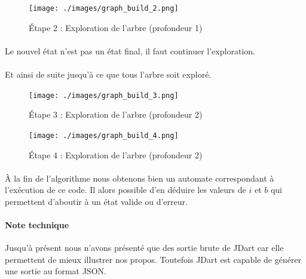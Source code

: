 \begin{minipage}{.44\linewidth}
 \centering
 \begin{figure}[H]
  \centering
  \texttt{[image: ./images/graph\_build\_2.png]}
  \caption{Étape 2 : Exploration de l'arbre (profondeur 1)}
 \end{figure}
\end{minipage}
\begin{minipage}{.44\linewidth}
 \paragraph{} Le nouvel état n'est pas un état final, il faut continuer 
l'exploration.
 \paragraph{} Et ainsi de suite jusqu'à ce que tous l'arbre soit exploré.
\end{minipage}

\begin{minipage}{.44\linewidth}
 \centering
 \begin{figure}[H]
  \centering
  \texttt{[image: ./images/graph\_build\_3.png]}
  \caption{Étape 3 : Exploration de l'arbre (profondeur 2)}
 \end{figure}
\end{minipage}
\begin{minipage}{.44\linewidth}
\begin{figure}[H]
  \centering
  \texttt{[image: ./images/graph\_build\_4.png]}
  \caption{Étape 4 : Exploration de l'arbre (profondeur 2)}
 \end{figure}
\end{minipage}

\paragraph{}
À la fin de l'algorithme nous obtenons bien un automate correspondant à 
l'exécution de ce code. Il alors possible d'en déduire les valeurs de $i$ et 
$b$ qui permettent d'aboutir à un état valide ou d'erreur.

\paragraph{Note technique}
Jusqu'à présent nous n'avons présenté que des sortie brute de JDart car elle 
permettent de mieux illustrer nos propos. Toutefois JDart est capable de 
générer une sortie au format JSON.

